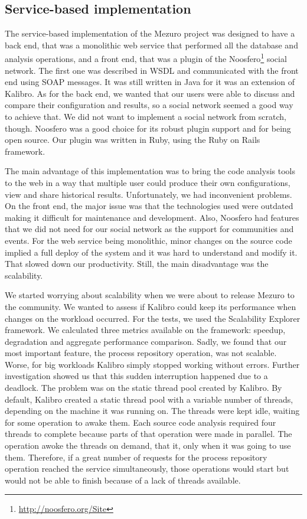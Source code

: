 \subsection{Service-based implementation}
\label{subsec:service-based-implementation}

The service-based implementation of the Mezuro project was designed to have a back end, that was a monolithic web service that performed all the database and analysis operations, and a front end, that was a plugin of the Noosfero\footnote{\url{http://noosfero.org/Site}} social network. The first one was described in WSDL and communicated with the front end using SOAP messages. It was still written in Java for it was an extension of Kalibro. As for the back end, we wanted that our users were able to discuss and compare their configuration and results, so a social network seemed a good way to achieve that. We did not want to implement a social network from scratch, though. Noosfero was a good choice for its robust plugin support and for being open source. Our plugin was written in Ruby, using the Ruby on Rails framework.

The main advantage of this implementation was to bring the code analysis tools to the web in a way that multiple user could produce their own configurations, view and share historical results. Unfortunately, we had inconvenient problems. On the front end, the major issue was that the technologies used were outdated making it difficult for maintenance and development. Also, Noosfero had features that we did not need for our social network as the support for communities and events. For the web service being monolithic, minor changes on the source code implied a full deploy of the system and it was hard to understand and modify it. That slowed down our productivity. Still, the main disadvantage was the scalability.

We started worrying about scalability when we were about to release Mezuro to the community. We wanted to assess if Kalibro could keep its performance when changes on the workload occurred. For the tests, we used the Scalability Explorer\cite{moura2013automated} framework. We calculated three metrics available on the framework: speedup, degradation and aggregate performance comparison\cite{li2012catalogue}. Sadly, we found that our most important feature, the process repository operation, was not scalable. Worse, for big workloads Kalibro simply stopped working without errors. Further investigation showed us that this sudden interruption happened due to a deadlock. The problem was on the static thread pool created by Kalibro. By default, Kalibro created a static thread pool with a variable number of threads, depending on the machine it was running on. The threads were kept idle, waiting for some operation to awake them. Each source code analysis required four threads to complete because parts of that operation were made in parallel. The operation awoke the threads on demand, that it, only when it was going to use them. Therefore, if a great number of requests for the process repository operation reached the service simultaneously, those operations would start but would not be able to finish because of a lack of threads available.

